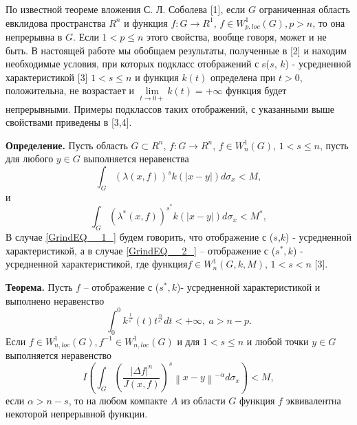 \vzmscaption

По известной теореме вложения С. Л. Соболева [1], если $G$ ограниченная область евклидова пространства $R^{n}$ и функция $f:G\to R^{1}$,
$f\in W_{p,loc}^{1} \left(G\right),p>n$, то она непрерывна в $G$. Если $1<p\le n$ этого свойства, вообще говоря, может и не быть. В настоящей работе мы обобщаем результаты,
полученные в [2] и находим необходимые условия, при которых подкласс отображений с s($s$, $k$) - усредненной характеристикой [3] $1<s\le n$ и функция $k\left(t\right)$ определена при $t>0$,
положительна, не возрастает и ${\mathop{\lim}\limits_{t\to 0+}} k\left(t\right)=+\infty$ функция будет непрерывными. Примеры подклассов таких отображений, с указанными выше свойствами приведены в [3,4]. 

\textbf{Определение.} Пусть область $G\subset R^{n}$, $f:G\to R^{n}$, $f\in W_{n}^{1} \left(G\right)$, $1<s\le n$, пусть для любого $y\in G$ выполняется неравенства 
\begin{equation} \label{GrindEQ__1_} 
    \int_{G}\left(\lambda (x,f)\right)^{s} k\left(\left|x-y\right|\right)d\sigma _{x} < M,
\end{equation} 
и
\begin{equation} \label{GrindEQ__2_} 
    \int _{G}\left(\lambda ^{*} (x,f)\right)^{s^{*} }  k\left(\left|x-y\right|\right)d\sigma _{x} <M^{*},
\end{equation} 
В случае \ref{GrindEQ__1_} будем говорить, что отображение с ($s$,$k$) - усредненной характеристикой,
а в случае \ref{GrindEQ__2_} -- отображение с ($s^{*} ,k$) - усредненной характеристикой, где функция\linebreak$f\in W_{n}^{1} \left(G,k,M\right)$, $1<s<n$ [3].

\textbf{Теорема.} Пусть $f$ -- отображение с ($s^{*} ,k$)- усредненной характеристикой и выполнено неравенство 
\begin{equation} \label{GrindEQ__3_} 
    \int_{0}^{0}k^{\frac{1}{s^{*} } } \left(t\right) t^{\frac{n}{s^{*} } } dt<+\infty, \ a>n-p.
\end{equation}
Если $f\in W_{n,loc}^{1} \left(G\right),f^{-1} \in W_{n,loc}^{1} \left(G\right)$ и для $1<s\le n$ и любой точки $y\in G$выполняется неравенство 
\begin{equation} \label{GrindEQ__4_}
    I\left(\int _{G}\left(\frac{\left|\Delta f\right|^{n} }{J\left(x,f\right)} \right)^{s} \left\| x-y\right\| ^{-\alpha } d\sigma _{x} \right)<M,
\end{equation}
если $\alpha >n-s$, то на любом компакте $A$ из области $G$ функция $f$ эквивалентна некоторой непрерывной функции.

